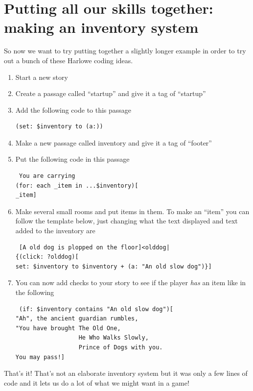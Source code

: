 \documentclass[a5paper,11pt]{article}
\begin{document}
\section{Putting all our skills together: making an inventory system}
So now we want to try putting together a slightly longer example in order to try out a bunch of these Harlowe coding ideas.

\begin{enumerate}
  \item Start a new story
  \item Create a passage called ``startup'' and give it a tag of ``startup''
  \item Add the following code to this passage
\begin{verbatim}
(set: $inventory to (a:))
\end{verbatim}
  \item Make a new passage called inventory and give it a tag of ``footer''
  \item Put the following code in this passage
\begin{verbatim}
 You are carrying
(for: each _item in ...$inventory)[
_item]
\end{verbatim}
  \item Make several small rooms and put items in them. To make an ``item'' you can follow the template below, just changing what the text displayed and text added to the inventory are
\begin{verbatim}
 [A old dog is plopped on the floor]<olddog|
{(click: ?olddog)[
set: $inventory to $inventory + (a: "An old slow dog")}]
\end{verbatim}
  \item You can now add checks to your story to see if the player \emph{has} an item like in the following
\begin{verbatim}
 (if: $inventory contains "An old slow dog")[
"Ah", the ancient guardian rumbles, 
"You have brought The Old One, 
                  He Who Walks Slowly, 
                  Prince of Dogs with you. 
You may pass!]
\end{verbatim}
\end{enumerate}
That's it! That's not an elaborate inventory system but it was only a few lines of code and it lets us do a lot of what we might want in a game!
\end{document}
